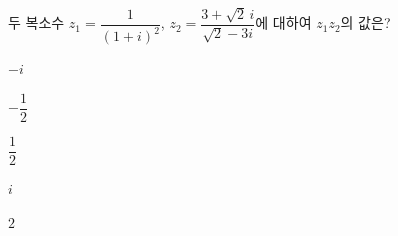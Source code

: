 두 복소수 $z_1=\dfrac{1}{(1+i)^2}$, $z_2=\dfrac{3+\sqrt{2}\,i}{\sqrt{2}-3i}$에 대하여 $z_1z_2$의 값은?
\begin{choices32}{\rule[-3ex]{0pt}{8ex}$-i$}{\rule[-3ex]{0pt}{8ex}$-\dfrac{1}{2}$}{\rule[-3ex]{0pt}{8ex}$\dfrac{1}{2}$}{\rule[-3ex]{0pt}{8ex}$i$}{\rule[-3ex]{0pt}{8ex}$2$}\end{choices32}
